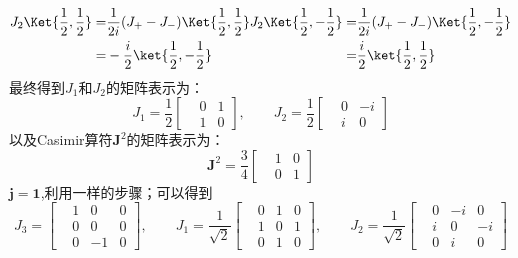 \begin{equation}
    \begin{aligned}
        J_2\Ket{\frac{1}{2},\frac{1}{2}}
        =&\frac{1}{2i}(J_+-J_-)\Ket{\frac{1}{2},\frac{1}{2}}\\
        =&-\frac{i}{2}\ket{\frac{1}{2},-\frac{1}{2}}\\
    \end{aligned}\\
    \begin{aligned}
        J_2\Ket{\frac{1}{2},-\frac{1}{2}}
        =&\frac{1}{2i}(J_+-J_-)\Ket{\frac{1}{2},-\frac{1}{2}}\\
        =&\frac{i}{2}\ket{\frac{1}{2},\frac{1}{2}}\\
    \end{aligned}
\end{equation}
最终得到$J_1$和$J_2$的矩阵表示为：
\begin{equation}
    J_1=\frac{1}{2}
    \begin{bmatrix}
        & 0&1\\
        & 1&0
    \end{bmatrix},\qquad
    J_2=\frac{1}{2}
    \begin{bmatrix}
        & 0&-i\\
        & i&0
    \end{bmatrix}
\end{equation}
以及Casimir算符$\pmb{J}^2$的矩阵表示为：
\begin{equation}
    \pmb{J}^2=\frac{3}{4}
    \begin{bmatrix}
        & 1&0\\
        & 0&1
    \end{bmatrix}
\end{equation}
\vspace{2ex}
$\mathbf{j=1}$,利用一样的步骤；可以得到
\begin{equation}
    J_3=
    \begin{bmatrix}
        & 1&0&0\\
        & 0&0&0\\
        & 0&-1&0
    \end{bmatrix},\qquad
    J_1=\frac{1}{\sqrt{2}}
    \begin{bmatrix}
        & 0&1&0\\
        & 1&0&1\\
        & 0&1&0
    \end{bmatrix},\qquad
    J_2=\frac{1}{\sqrt{2}}
    \begin{bmatrix}
        & 0&-i&0\\
        & i&0&-i\\
        & 0&i&0
    \end{bmatrix}
\end{equation}
